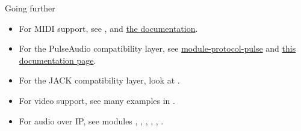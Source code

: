 \begin{frame}{Going further}
  \begin{itemize}

  \item For MIDI support, see , 
    and \href{https://docs.pipewire.org/page_midi.html}{the documentation}.

  \item For the PulseAudio compatibility layer, see
    \href{https://docs.pipewire.org/page_module_protocol_pulse.html
    }{module-protocol-pulse} and \href{
      https://docs.pipewire.org/page_pulseaudio.html}{this documentation page}.

  \item For the JACK compatibility layer, look at .

  \item For video support, see many examples in .

  \item For audio over IP, see modules , ,
    , , , .

  \end{itemize}
\end{frame}
